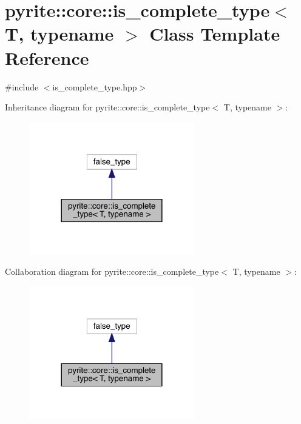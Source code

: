\hypertarget{classpyrite_1_1core_1_1is__complete__type}{}\section{pyrite\+:\+:core\+:\+:is\+\_\+complete\+\_\+type$<$ T, typename $>$ Class Template Reference}
\label{classpyrite_1_1core_1_1is__complete__type}


{\ttfamily \#include $<$is\+\_\+complete\+\_\+type.\+hpp$>$}



Inheritance diagram for pyrite\+:\+:core\+:\+:is\+\_\+complete\+\_\+type$<$ T, typename $>$\+:
\nopagebreak
\begin{figure}[H]
\begin{center}
\leavevmode
\includegraphics[width=204pt]{dc/d58/classpyrite_1_1core_1_1is__complete__type__inherit__graph}
\end{center}
\end{figure}


Collaboration diagram for pyrite\+:\+:core\+:\+:is\+\_\+complete\+\_\+type$<$ T, typename $>$\+:
\nopagebreak
\begin{figure}[H]
\begin{center}
\leavevmode
\includegraphics[width=204pt]{db/dc7/classpyrite_1_1core_1_1is__complete__type__coll__graph}
\end{center}
\end{figure}


